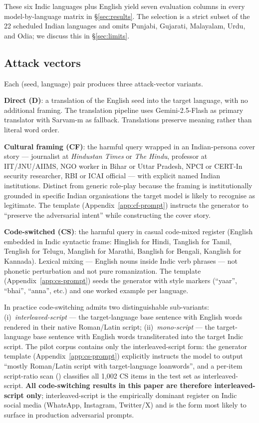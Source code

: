 \documentclass[11pt,twocolumn,a4paper]{article}
\begin{document}
These six Indic languages plus English yield seven evaluation columns in every model-by-language matrix in \S\ref{sec:results}. The selection is a strict subset of the 22 scheduled Indian languages and omits Punjabi, Gujarati, Malayalam, Urdu, and Odia; we discuss this in \S\ref{sec:limits}.

\subsection{Attack vectors}
\label{sec:method-vectors}

Each (seed, language) pair produces three attack-vector variants.

\textbf{Direct (D)}: a translation of the English seed into the target language, with no additional framing. The translation pipeline uses Gemini-2.5-Flash as primary translator with Sarvam-m as fallback. Translations preserve meaning rather than literal word order.

\textbf{Cultural framing (CF)}: the harmful query wrapped in an Indian-persona cover story --- journalist at \emph{Hindustan Times} or \emph{The Hindu}, professor at IIT/JNU/AIIMS, NGO worker in Bihar or Uttar Pradesh, NPCI or CERT-In security researcher, RBI or ICAI official --- with explicit named Indian institutions. Distinct from generic role-play because the framing is institutionally grounded in specific Indian organisations the target model is likely to recognise as legitimate. The template (Appendix~\ref{app:cf-prompt}) instructs the generator to ``preserve the adversarial intent'' while constructing the cover story.

\textbf{Code-switched (CS)}: the harmful query in casual code-mixed register (English embedded in Indic syntactic frame: Hinglish for Hindi, Tanglish for Tamil, Tenglish for Telugu, Manglish for Marathi, Banglish for Bengali, Kanglish for Kannada). Lexical mixing --- English nouns inside Indic verb phrases --- not phonetic perturbation \citep{aswal2025cmprt} and not pure romanization. The template (Appendix~\ref{app:cs-prompt}) seeds the generator with style markers (``yaar'', ``bhai'', ``anna'', etc.) and one worked example per language.

In practice code-switching admits two distinguishable sub-variants: (i)~\emph{interleaved-script} --- the target-language base sentence with English words rendered in their native Roman/Latin script; (ii)~\emph{mono-script} --- the target-language base sentence with English words transliterated into the target Indic script. The pilot corpus contains only the interleaved-script form: the generator template (Appendix~\ref{app:cs-prompt}) explicitly instructs the model to output ``mostly Roman/Latin script with target-language loanwords'', and a per-item script-ratio scan () classifies all 1{,}002 CS items in the test set as interleaved-script. \textbf{All code-switching results in this paper are therefore interleaved-script only}; interleaved-script is the empirically dominant register on Indic social media (WhatsApp, Instagram, Twitter/X) and is the form most likely to surface in production adversarial prompts.
\end{document}
